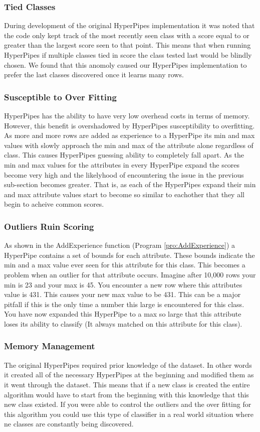 \subsubsection{Tied Classes}
During development of the original HyperPipes implementation it was noted 
that the code only kept track of the most recently seen class with a score 
equal to or greater than the largest score seen to that point. This means
that when running HyperPipes if multiple classes tied in score the class
tested last would be blindly chosen. We found that this anomoly caused our 
HyperPipes implementation to prefer the last classes discovered once it 
learns many rows.
\subsubsection{Susceptible to Over Fitting}
HyperPipes has the ability to have very low overhead costs in terms of 
memory. However, this benefit is overshadowed by HyperPipes susceptibility 
to overfitting. As more and more rows are added as experience to a HyperPipe 
its min and max values with slowly approach the min and max of the attribute 
alone regardless of class. This causes HyperPipes guessing ability to 
completely fall apart. As the min and max values for the attributes in every
HyperPipe expand the scores become very high and the likelyhood of 
encountering the issue in the previous sub-section becomes greater. That is, 
as each of the HyperPipes expand their min and max attribute values start to 
become so similar to eachother that they all begin to acheive common scores.
\subsubsection{Outliers Ruin Scoring}
As shown in the AddExperience function (Program \ref{pro:AddExperience}) a HyperPipe contains a set 
of bounds for each attribute. These bounds indicate the min and a max value 
ever seen for this attribute for this class. This becomes a problem when an 
outlier for that attribute occurs. Imagine after 10,000 rows your min is 23 
and your max is 45. You encounter a new row where this attributes value is 
431. This causes your new max value to be 431. This can be a major pitfall 
if this is the only time a number this large is encountered for this class. 
 You have now expanded this HyperPipe to a max so large that this attribute 
loses its ability to classify (It always matched on this attribute for this 
class).
\subsubsection{Memory Management}
The original HyperPipes required prior knowledge of the dataset. In other 
words it created all of the necessary HyperPipes at the beginning and 
modified them as it went through the dataset. This means that if a new class 
is created the entire algorithm would have to start from the beginning with 
this knowledge that this new class existed. If you were able to control the
outliers and the over fitting for this algorithm you could use this type of 
classifier in a real world situation where ne classes are constantly being 
discovered. 